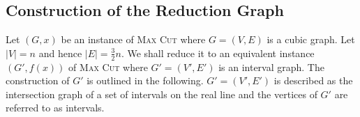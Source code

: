 \documentclass[11pt]{article}
\begin{document}
\subsection{Construction of the Reduction Graph} \label{sec: reduction}
% 
%  
%  
%  
Let $(G, x)$ be an instance of \textsc{Max Cut} where $G = (V, E)$ is a cubic graph. Let $|V| = n$ and hence $|E| = \frac{3}{2}n$. We shall reduce it to an equivalent instance $(G', f(x))$ of \textsc{Max Cut} where $G' = (V', E')$ is an interval graph. The construction of $G'$ is outlined in the following. $G' = (V', E')$ is described as the intersection graph of a set of intervals on the real line and the vertices of $G'$ are referred to as intervals.
\end{document}
